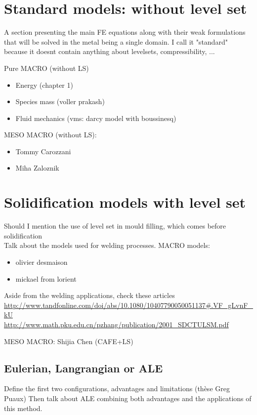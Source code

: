 \section{Standard models: without level set}
A section presenting the main FE equations along with their weak formulations that will be solved 
in the metal being a single domain. I call it "standard" because it doesnt contain anything about 
levelsets, compressibility, ...

Pure MACRO (without LS)
\begin{itemize}
\item Energy (chapter 1)
\item Species mass (voller prakash) 
\item Fluid mechanics (vms: darcy model with boussinesq)
\end{itemize}

MESO MACRO (without LS): 
\begin{itemize}
\item Tommy Carozzani
\item Miha Zaloznik
\end{itemize}

\section{Solidification models with level set}
Should I mention the use of level set in mould filling, which comes before solidification \\
Talk about the models used for welding processes. 
MACRO models:
\begin{itemize}
\item olivier desmaison
\item mickael from lorient 
\end{itemize}
Aside from the welding applications, check these articles
\url{http://www.tandfonline.com/doi/abs/10.1080/10407790050051137#.VF_gLvnF_kU} \\
\url{http://www.math.pku.edu.cn/pzhang/publication/2001_SDCTULSM.pdf}

MESO MACRO: Shijia Chen (CAFE+LS)

\subsection{Eulerian, Langrangian or ALE}
Define the first two configurations, advantages and limitations (thèse Greg Puaux)
Then talk about ALE combining both advantages and the applications of this method.
